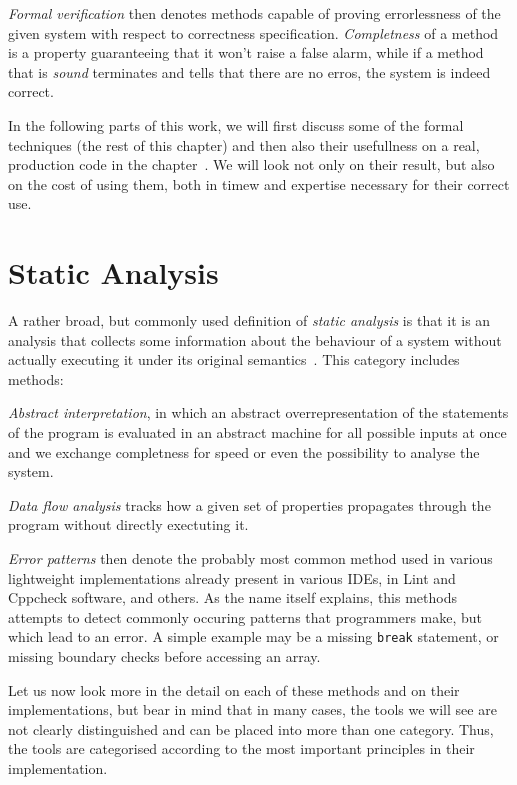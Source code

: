 {\em Formal verification} then denotes methods capable of proving errorlessness of the given system with respect to correctness specification. {\em Completness} of a method is a property guaranteeing that it won't raise a false alarm, while if a method that is {\em sound} terminates and tells that there are no erros, the system is indeed correct.

In the following parts of this work, we will first discuss some of the formal techniques (the rest of this chapter) and then also their usefullness on a real, production code in the chapter~. We will look not only on their result, but also on the cost of using them, both in timew and expertise necessary for their correct use.

\section{Static Analysis}\label{chap:fav:staticAnalysis}
A rather broad, but commonly used definition of {\em static analysis} is that it is an analysis that collects some information about the behaviour of a system without actually executing it under its original semantics~\cite[Chap. 2.2]{KrenaVojnarOverview}. This category includes methods:

{\em Abstract interpretation}, in which an abstract overrepresentation of the statements of the program is evaluated in an abstract machine for all possible inputs at once and we exchange completness for speed or even the possibility to analyse the system.

{\em Data flow analysis} tracks how a given set of properties propagates through the program without directly exectuting it.

{\em Error patterns} then denote the probably most common method used in various lightweight implementations already present in various IDEs, in Lint and Cppcheck software, and others. As the name itself explains, this methods attempts to detect commonly occuring patterns that programmers make, but which lead to an error. A simple example may be a missing {\tt break} statement, or missing boundary checks before accessing an array.

Let us now look more in the detail on each of these methods and on their implementations, but bear in mind that in many cases, the tools we will see are not clearly distinguished and can be placed into more than one category. Thus, the tools are categorised according to the most important principles in their implementation.

